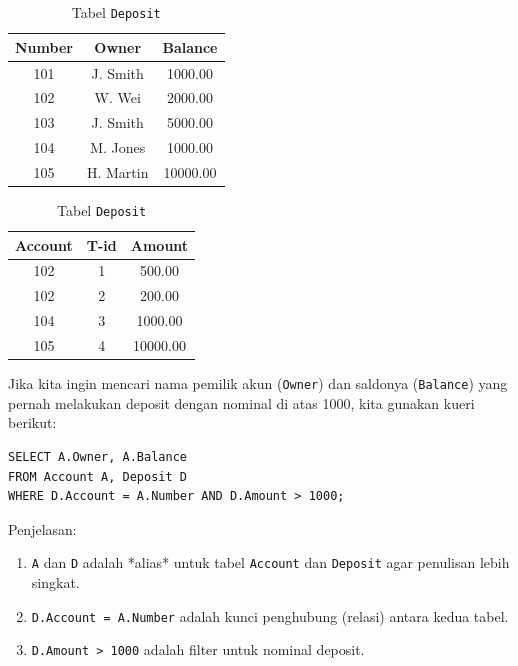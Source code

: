 \documentclass[11pt,a4paper]{article}
\begin{document}
\begin{table}[H]
	\centering
	\small
	\begin{minipage}{0.45\textwidth}
		\centering
		\caption{Tabel \texttt{Account}}
		\begin{tabular}{@{} c c c @{}}
			\toprule
			\textbf{Number} & \textbf{Owner} & \textbf{Balance} \\
			\midrule
			101             & J. Smith       & 1000.00          \\
			102             & W. Wei         & 2000.00          \\
			103             & J. Smith       & 5000.00          \\
			104             & M. Jones       & 1000.00          \\
			105             & H. Martin      & 10000.00         \\
			\bottomrule
		\end{tabular}
	\end{minipage}
	\hfill
	\begin{minipage}{0.45\textwidth}
		\centering
		\caption{Tabel \texttt{Deposit}}
		\begin{tabular}{@{} c c c @{}}
			\toprule
			\textbf{Account} & \textbf{T-id} & \textbf{Amount} \\
			\midrule
			102              & 1             & 500.00          \\
			102              & 2             & 200.00          \\
			104              & 3             & 1000.00         \\
			105              & 4             & 10000.00        \\
			\bottomrule
		\end{tabular}
	\end{minipage}
\end{table}

Jika kita ingin mencari nama pemilik akun (\texttt{Owner}) dan saldonya (\texttt{Balance}) yang pernah melakukan deposit dengan nominal di atas 1000, kita gunakan kueri berikut:

\begin{lstlisting}
SELECT A.Owner, A.Balance
FROM Account A, Deposit D
WHERE D.Account = A.Number AND D.Amount > 1000;
\end{lstlisting}

Penjelasan:
\begin{enumerate}
	\item \texttt{A} dan \texttt{D} adalah *alias* untuk tabel \texttt{Account} dan \texttt{Deposit} agar penulisan lebih singkat.
	\item \texttt{D.Account = A.Number} adalah kunci penghubung (relasi) antara kedua tabel.
	\item \texttt{D.Amount > 1000} adalah filter untuk nominal deposit.
\end{enumerate}
\end{document}
